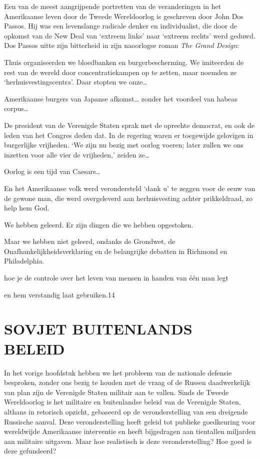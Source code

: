 \documentclass[
  a5paper,
  smalldemyvopaper,10pt,twoside,onecolumn,openright,extrafontsizes,hidelinks]{memoir}
\renewenvironment{quote}%
               {\list{}{\rightmargin=.6cm\leftmargin=.6cm}%
                \itshape \item[]}%
               {\endlist}
\begin{document}
Een van de meest aangrijpende portretten van de veranderingen in het
Amerikaanse leven door de Tweede Wereldoorlog is geschreven door John
Dos Passos. Hij was een levenslange radicale denker en individualist,
die door de opkomst van de New Deal van `extreem links' naar `extreem
rechts' werd geduwd. Dos Passos uitte zijn bitterheid in zijn naoorlogse
roman \emph{The Grand Design}:

\begin{quote}
Thuis organiseerden we bloedbanken en burgerbescherming. We imiteerden
de rest van de wereld door concentratiekampen op te zetten, maar noemden
ze `herhuisvestingscentra'. Daar stopten we onze\ldots{}

Amerikaanse burgers van Japanse afkomst\ldots{} zonder het voordeel van
habeas corpus\ldots{}

De president van de Verenigde Staten sprak met de oprechte democrat, en
ook de leden van het Congres deden dat. In de regering waren er
toegewijde gelovigen in burgerlijke vrijheden. `We zijn nu bezig met
oorlog voeren; later zullen we ons inzetten voor alle vier de
vrijheden,' zeiden ze\ldots{}

Oorlog is een tijd van Caesars\ldots{}

En het Amerikaanse volk werd verondersteld `dank u' te zeggen voor de
eeuw van de gewone man, die werd overgeleverd aan herhuisvesting achter
prikkeldraad, zo help hem God.

We hebben geleerd. Er zijn dingen die we hebben opgestoken.

Maar we hebben niet geleerd, ondanks de Grondwet, de
Onafhankelijkheidsverklaring en de belangrijke debatten in Richmond en
Philadelphia.

hoe je de controle over het leven van mensen in handen van één man legt

en hem verstandig laat gebruiken.14
\end{quote}

\section{SOVJET BUITENLANDS BELEID}\label{sovjet-buitenlands-beleid}

In het vorige hoofdstuk hebben we het probleem van de nationale defensie
besproken, zonder ons bezig te houden met de vraag of de Russen
daadwerkelijk van plan zijn de Verenigde Staten militair aan te vallen.
Sinds de Tweede Wereldoorlog is het militaire en buitenlandse beleid van
de Verenigde Staten, althans in retorisch opzicht, gebaseerd op de
veronderstelling van een dreigende Russische aanval. Deze
veronderstelling heeft geleid tot publieke goedkeuring voor wereldwijde
Amerikaanse interventie en heeft bijgedragen aan tientallen miljarden
aan militaire uitgaven. Maar hoe realistisch is deze veronderstelling?
Hoe goed is deze gefundeerd?
\end{document}
